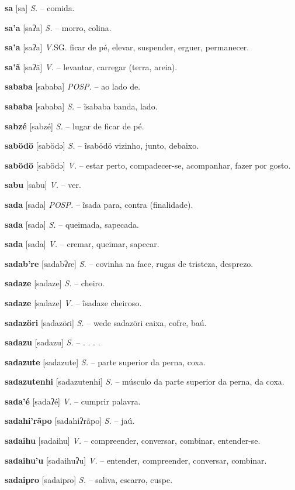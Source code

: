 \textbf{sa} [sa] \textit{S.} -- comida.

\textbf{sa'a} [saʔa] \textit{S.} -- morro, colina.

\textbf{sa'a} [saʔa] \textit{V.}SG. ficar de pé, elevar, suspender, erguer, permanecer.

\textbf{sa'ã} [saʔã] \textit{V.} -- levantar, carregar (terra, areia).

\textbf{sababa} [sababa] \textit{POSP.} -- ao lado de.

\textbf{sababa} [sababa] \textit{S.} -- ĩsababa banda, lado.

\textbf{sabzé} [sabzé] \textit{S.} -- lugar de ficar de pé.

\textbf{sabödö} [sabödə] \textit{S.} -- ĩsabödö vizinho, junto, debaixo.

\textbf{sabödö} [sabödə] \textit{V.} -- estar perto, compadecer-se, acompanhar, fazer por gosto.

\textbf{sabu} [sabu] \textit{V.} -- ver.

\textbf{sada} [sada] \textit{POSP.} -- ĩsada para, contra (finalidade).

\textbf{sada} [sada] \textit{S.} -- queimada, sapecada.

\textbf{sada} [sada] \textit{V.} -- cremar, queimar, sapecar.

\textbf{sadab're} [sadabʔɾe] \textit{S.} -- covinha na face, rugas de tristeza, desprezo.

\textbf{sadaze} [sadaze] \textit{S.} -- cheiro.

\textbf{sadaze} [sadaze] \textit{V.} -- ĩsadaze cheiroso.

\textbf{sadazöri} [sadazöɾi] \textit{S.} -- wede sadazöri caixa, cofre, baú.

\textbf{sadazu} [sadazu] \textit{S.} -- . . . .

\textbf{sadazute} [sadazute] \textit{S.} -- parte superior da perna, coxa.

\textbf{sadazutenhi} [sadazutenhi] \textit{S.} -- músculo da parte superior da perna, da coxa.

\textbf{sada'é} [sadaʔé] \textit{V.} -- cumprir palavra.

\textbf{sadahi'rãpo} [sadahiʔrãpo] \textit{S.} -- jaú.

\textbf{sadaihu} [sadaihu] \textit{V.} -- compreender, conversar, combinar, entender-se.

\textbf{sadaihu'u} [sadaihuʔu] \textit{V.} -- entender, compreender, conversar, combinar.

\textbf{sadaipro} [sadaipɾo] \textit{S.} -- saliva, escarro, cuspe.

